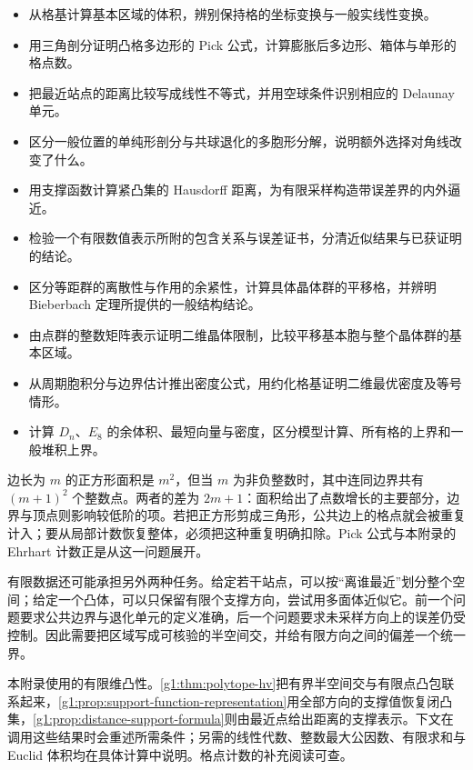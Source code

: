 \begin{learninggoals}
	\begin{itemize}
		\item 从格基计算基本区域的体积，辨别保持格的坐标变换与一般实线性变换。
		\item 用三角剖分证明凸格多边形的 Pick 公式，计算膨胀后多边形、箱体与单形的格点数。
		\item 把最近站点的距离比较写成线性不等式，并用空球条件识别相应的 Delaunay 单元。
		\item 区分一般位置的单纯形剖分与共球退化的多胞形分解，说明额外选择对角线改变了什么。
		\item 用支撑函数计算紧凸集的 Hausdorff 距离，为有限采样构造带误差界的内外逼近。
		\item 检验一个有限数值表示所附的包含关系与误差证书，分清近似结果与已获证明的结论。
		\item 区分等距群的离散性与作用的余紧性，计算具体晶体群的平移格，并辨明 Bieberbach 定理所提供的一般结构结论。
		\item 由点群的整数矩阵表示证明二维晶体限制，比较平移基本胞与整个晶体群的基本区域。
		\item 从周期胞积分与边界估计推出密度公式，用约化格基证明二维最优密度及等号情形。
		\item 计算 \(D_n\)、\(E_8\) 的余体积、最短向量与密度，区分模型计算、所有格的上界和一般堆积上界。
	\end{itemize}
\end{learninggoals}

边长为 \(m\) 的正方形面积是 \(m^2\)，但当 \(m\) 为非负整数时，其中连同边界共有 \((m+1)^2\) 个整数点。两者的差为 \(2m+1\)：面积给出了点数增长的主要部分，边界与顶点则影响较低阶的项。若把正方形剪成三角形，公共边上的格点就会被重复计入；要从局部计数恢复整体，必须把这种重复明确扣除。Pick 公式与本附录的 Ehrhart 计数正是从这一问题展开。

\ProseParagraphBreak

有限数据还可能承担另外两种任务。给定若干站点，可以按“离谁最近”划分整个空间；给定一个凸体，可以只保留有限个支撑方向，尝试用多面体近似它。前一个问题要求公共边界与退化单元的定义准确，后一个问题要求未采样方向上的误差仍受控制。因此需要把区域写成可核验的半空间交，并给有限方向之间的偏差一个统一界。

\ProseParagraphBreak

本附录使用的有限维凸性。\cref{g1:thm:polytope-hv}把有界半空间交与有限点凸包联系起来，\cref{g1:prop:support-function-representation}用全部方向的支撑值恢复闭凸集，\cref{g1:prop:distance-support-formula}则由最近点给出距离的支撑表示。下文在调用这些结果时会重述所需条件；另需的线性代数、整数最大公因数、有限求和与Euclid 体积均在具体计算中说明。格点计数的补充阅读可查\cite[第2.2--2.3、2.6、3.1--3.5节]{BeckRobins2015}。

